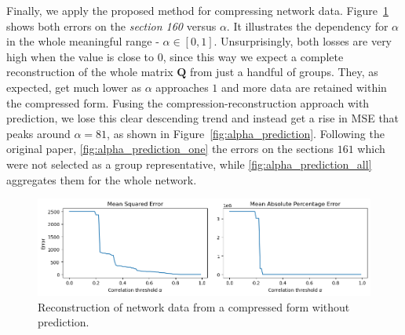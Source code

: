 Finally, we apply the proposed method for compressing network data.
Figure~\ref{fig:reconstruction_no_prediction} shows both errors on the
\textit{section 160} versus $\alpha$. It illustrates the
dependency for $\alpha$ in the whole meaningful range - $\alpha\in[0,1]$.
Unsurprisingly, both losses are very high when the value is close to $0$, since
this way we expect a complete reconstruction of the whole matrix $\mathbf{Q}$
from just a handful of groups. They, as expected, get much lower as $\alpha$
approaches $1$ and more data are retained within the compressed form. Fusing the
compression-reconstruction approach with prediction, we lose this clear
descending trend and instead get a rise in MSE that peaks around $\alpha=81$,
as shown in Figure~\ref{fig:alpha_prediction}. Following the original paper,
\ref{fig:alpha_prediction_one} the errors on the sections $161$ which were not
selected as a group representative, while \ref{fig:alpha_prediction_all}
aggregates them for the whole network.

\begin{figure}
	\includegraphics[width=\textwidth,keepaspectratio]{img/alpha_reconstruction_all.png}
	\centering
	\caption{Reconstruction of network data from a compressed form without prediction.}
	\label{fig:reconstruction_no_prediction}
\end{figure}

